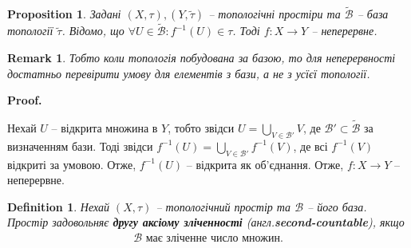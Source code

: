 \documentclass[a4paper, 10pt]{article}
\makeatletter
\theoremstyle{theoremdd}
\newtheorem{definition}[theorem]{Definition}
\newtheorem{proposition}[theorem]{Proposition}
\newtheorem{remark}[theorem]{Remark}
\renewenvironment{proof}[1][Proof.\\]{\par
\pushQED{\hfill \qed}%
\normalfont \topsep6\p@\@plus6\p@\relax
\trivlist
\item\relax
{\bfseries
#1\@addpunct{.}}\hspace\labelsep\ignorespaces
}{%
\popQED\endtrivlist\@endpefalse
}
\makeatother
\begin{document}
\begin{proposition}
Задані $(X,\tau), (Y,\tilde{\tau})$ -- топологічні простіри та $\tilde{\mathcal{B}}$ -- база топології $\tilde{\tau}$. Відомо, що $\forall U \in \tilde{\mathcal{B}}: f^{-1}(U) \in \tau$. Тоді $f \colon X \to Y$ -- неперервне.
\end{proposition}

\begin{remark}
Тобто коли топологія побудована за базою, то для неперервності достатньо перевірити умову для елементів з бази, а не з усїєї топології.
\end{remark}

\begin{proof}
Нехай $U$ -- відкрита множина в $Y$, тобто звідси $U = \displaystyle\bigcup_{V \in \mathcal{B}'} V$, де $\mathcal{B}' \subset \tilde{\mathcal{B}}$ за визначенням бази. Тоді звідси $f^{-1}(U) = \displaystyle\bigcup_{V \in \mathcal{B}'} f^{-1}(V)$, де всі $f^{-1}(V)$ відкриті за умовою. Отже, $f^{-1}(U)$ -- відкрита як об'єднання. Отже, $f \colon X \to Y$ -- неперервне.
\end{proof}

\begin{definition}
Нехай $(X,\tau)$ -- топологічний простір та $\mathcal{B}$ -- його база.\\
Простір задовольняє \textbf{другу аксіому зліченності} (англ.\@ \textbf{second-countable}), якщо
\begin{align*}
\mathcal{B} \text{ має зліченне число множин.}
\end{align*}
\end{definition}
\end{document}

